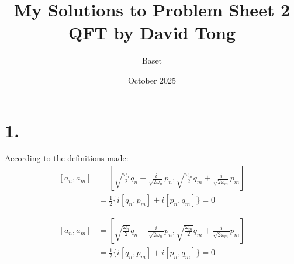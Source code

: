 \documentclass{article}
\title{My Solutions to Problem Sheet 2 QFT by David Tong}
\author{Baset}
\date{October 2025}
\newcommand{\onehalf}{\frac{1}{2}}
\begin{document}
\maketitle
\section*{1.}
According to the definitions made:
\begin{equation}
    \begin{split}
    [a_n,a_m] &= [\sqrt{\frac{\omega_n}{2}}q_n+\frac{i}{\sqrt{2\omega_n}}p_n,
    \sqrt{\frac{\omega_m}{2}}q_m+\frac{i}{\sqrt{2\omega_m}}p_m]\\
    &= \onehalf \{ i[q_n,p_m] + i[p_n,q_m] \} = 0
    \end{split}
\end{equation}

\begin{equation}
    \begin{split}
    [a_n,a_m] &= [\sqrt{\frac{\omega_n}{2}}q_n+\frac{i}{\sqrt{2\omega_n}}p_n,
    \sqrt{\frac{\omega_m}{2}}q_m+\frac{i}{\sqrt{2\omega_m}}p_m]\\
    &= \onehalf \{ i[q_n,p_m] + i[p_n,q_m] \} = 0
    \end{split}
\end{equation}
\end{document}
